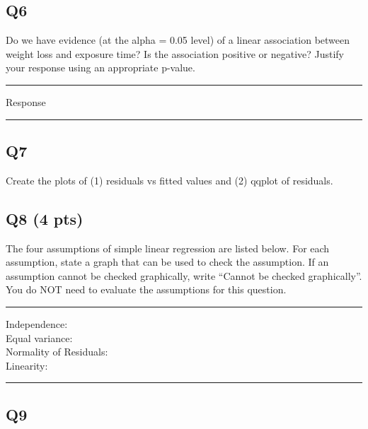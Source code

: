 \documentclass[
]{article}
\begin{document}
\hypertarget{q6}{%
\subsection{Q6}\label{q6}}

Do we have evidence (at the alpha = 0.05 level) of a linear association
between weight loss and exposure time? Is the association positive or
negative? Justify your response using an appropriate p-value.

\begin{center}\rule{0.5\linewidth}{0.5pt}\end{center}

Response

\begin{center}\rule{0.5\linewidth}{0.5pt}\end{center}

\hypertarget{q7}{%
\subsection{Q7}\label{q7}}

Create the plots of (1) residuals vs fitted values and (2) qqplot of
residuals.

\hypertarget{q8-4-pts}{%
\subsection{Q8 (4 pts)}\label{q8-4-pts}}

The four assumptions of simple linear regression are listed below. For
each assumption, state a graph that can be used to check the assumption.
If an assumption cannot be checked graphically, write ``Cannot be
checked graphically''. You do NOT need to evaluate the assumptions for
this question.

\begin{center}\rule{0.5\linewidth}{0.5pt}\end{center}

Independence:\\
Equal variance:\\
Normality of Residuals:\\
Linearity:\\

\begin{center}\rule{0.5\linewidth}{0.5pt}\end{center}

\hypertarget{q9}{%
\subsection{Q9}\label{q9}}
\end{document}
